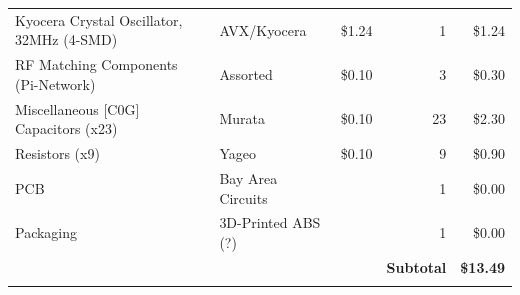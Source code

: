 \documentclass[journal,compsoc]{IEEEtran}
\begin{document}
\begin{table}[]
\begin{tabular}{|rrr|r|r|}
    \multicolumn{1}{|l}{Kyocera Crystal Oscillator, 32MHz (4-SMD)} & \multicolumn{1}{l}{AVX/Kyocera} & \multicolumn{1}{r}{\$1.24 } & \multicolumn{1}{r}{1} & \$1.24 \\
    \multicolumn{1}{|l}{RF Matching Components (Pi-Network)} & \multicolumn{1}{l}{Assorted} & \multicolumn{1}{r}{\$0.10 } & \multicolumn{1}{r}{3} & \$0.30 \\
    \multicolumn{1}{|l}{Miscellaneous [C0G] Capacitors (x23)} & \multicolumn{1}{l}{Murata} & \multicolumn{1}{r}{\$0.10 } & \multicolumn{1}{r}{23} & \$2.30 \\
    \multicolumn{1}{|l}{Resistors (x9)} & \multicolumn{1}{l}{Yageo} & \multicolumn{1}{r}{\$0.10 } & \multicolumn{1}{r}{9} & \$0.90 \\
    \multicolumn{1}{|l}{PCB} & \multicolumn{1}{l}{Bay Area Circuits} & \multicolumn{1}{r}{} & \multicolumn{1}{r}{1} & \$0.00 \\
    \multicolumn{1}{|l}{Packaging} & \multicolumn{1}{l}{3D-Printed ABS (?)} & \multicolumn{1}{r}{} & \multicolumn{1}{r}{1} & \$0.00 \\
\cmidrule{4-5}          &       &       & \cellcolor[rgb]{ .608,  .761,  .902} \textbf{Subtotal} & \cellcolor[rgb]{ .608,  .761,  .902} \textbf{\$13.49} \\
    \midrule
          &       & \multicolumn{1}{r}{} & \multicolumn{1}{r}{} &  \\
    \midrule
    \end{tabular}%
  \label{tab:addlabel}%
\end{table}%
\end{document}
